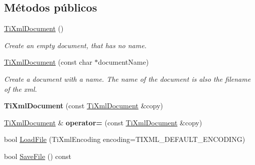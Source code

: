 \subsection*{Métodos públicos}
\begin{DoxyCompactItemize}
\item 
\hypertarget{class_ti_xml_document_a9f5e84335708fde98400230f9f12659c}{\hyperlink{class_ti_xml_document_a9f5e84335708fde98400230f9f12659c}{Ti\-Xml\-Document} ()}\label{class_ti_xml_document_a9f5e84335708fde98400230f9f12659c}

\begin{DoxyCompactList}\small\item\em Create an empty document, that has no name. \end{DoxyCompactList}\item 
\hypertarget{class_ti_xml_document_ae4508b452d0c3061db085f3db27b8396}{\hyperlink{class_ti_xml_document_ae4508b452d0c3061db085f3db27b8396}{Ti\-Xml\-Document} (const char $\ast$document\-Name)}\label{class_ti_xml_document_ae4508b452d0c3061db085f3db27b8396}

\begin{DoxyCompactList}\small\item\em Create a document with a name. The name of the document is also the filename of the xml. \end{DoxyCompactList}\item 
\hypertarget{class_ti_xml_document_a323a7486e7da6099cdc19a5ff7e74b07}{{\bfseries Ti\-Xml\-Document} (const \hyperlink{class_ti_xml_document}{Ti\-Xml\-Document} \&copy)}\label{class_ti_xml_document_a323a7486e7da6099cdc19a5ff7e74b07}

\item 
\hypertarget{class_ti_xml_document_aa56fd4dbe8917d2033d865909e2d737e}{\hyperlink{class_ti_xml_document}{Ti\-Xml\-Document} \& {\bfseries operator=} (const \hyperlink{class_ti_xml_document}{Ti\-Xml\-Document} \&copy)}\label{class_ti_xml_document_aa56fd4dbe8917d2033d865909e2d737e}

\item 
bool \hyperlink{class_ti_xml_document_a4c852a889c02cf251117fd1d9fe1845f}{Load\-File} (Ti\-Xml\-Encoding encoding=T\-I\-X\-M\-L\-\_\-\-D\-E\-F\-A\-U\-L\-T\-\_\-\-E\-N\-C\-O\-D\-I\-N\-G)
\item 
\hypertarget{class_ti_xml_document_a21c0aeb0d0a720169ad4ac89523ebe93}{bool \hyperlink{class_ti_xml_document_a21c0aeb0d0a720169ad4ac89523ebe93}{Save\-File} () const }\label{class_ti_xml_document_a21c0aeb0d0a720169ad4ac89523ebe93}


\end{DoxyCompactItemize}
